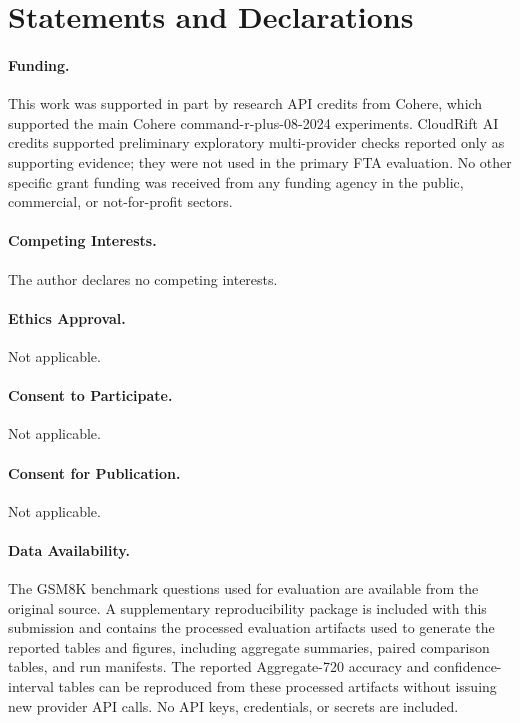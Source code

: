 \section*{Statements and Declarations}

\paragraph{Funding.}
This work was supported in part by research API credits from Cohere, which
supported the main Cohere command-r-plus-08-2024 experiments. CloudRift AI
credits supported preliminary exploratory multi-provider checks reported only
as supporting evidence; they were not used in the primary FTA evaluation. No
other specific grant funding was received from any funding agency in the public,
commercial, or not-for-profit sectors.

\paragraph{Competing Interests.}
The author declares no competing interests.

\paragraph{Ethics Approval.}
Not applicable.

\paragraph{Consent to Participate.}
Not applicable.

\paragraph{Consent for Publication.}
Not applicable.

\paragraph{Data Availability.}
The GSM8K benchmark questions used for evaluation are available from the
original source. A supplementary reproducibility package is included with this
submission and contains the processed evaluation artifacts used to generate the
reported tables and figures, including aggregate summaries, paired comparison
tables, and run manifests. The reported Aggregate-720 accuracy and
confidence-interval tables can be reproduced from these processed artifacts
without issuing new provider API calls. No API keys, credentials, or secrets
are included.

